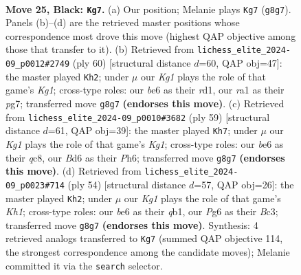 \documentclass[11pt]{article}
\begin{document}
\clearpage

\begin{figure}[p]\centering
\begin{subfigure}{0.46\textwidth}\centering
\resizebox{\linewidth}{!}{%
\newchessgame
\chessboard[
  setfen={6k1/pp5p/3bB1p1/8/8/5qP1/PP3P1P/R5K1 b - - 0 25},
  showmover=false,
  pgfstyle=straightmove, color=movearrow, markmove={g8-g7}
]}
\caption{}
\end{subfigure}\hfill
\begin{subfigure}{0.46\textwidth}\centering
\resizebox{\linewidth}{!}{%
\newchessgame
\chessboard[
  setfen={6k1/pQ3pp1/4pb1p/2p5/8/7P/P4PP1/3r2K1 w - - 2 31},
  showmover=false,
  pgfstyle=straightmove, color=movearrow, markmove={g1-h2}
]}
\caption{}
\end{subfigure}
\\[4pt]
\begin{subfigure}{0.46\textwidth}\centering
\resizebox{\linewidth}{!}{%
\newchessgame
\chessboard[
  setfen={2Q3k1/5pp1/7p/1p1P4/8/1P3qP1/r4P1P/4R1K1 b - - 2 30},
  showmover=false,
  pgfstyle=straightmove, color=movearrow, markmove={g8-h7}
]}
\caption{}
\end{subfigure}\hfill
\begin{subfigure}{0.46\textwidth}\centering
\resizebox{\linewidth}{!}{%
\newchessgame
\chessboard[
  setfen={4b1k1/p4p1p/3Q2p1/2p5/8/2B2P1P/PP4P1/1q5K w - - 1 28},
  showmover=false,
  pgfstyle=straightmove, color=movearrow, markmove={h1-h2}
]}
\caption{}
\end{subfigure}
\caption{\textbf{Move 25, Black: \texttt{Kg7}.} (a) Our position; Melanie plays \texttt{Kg7} (\texttt{g8g7}). Panels (b)--(d) are the retrieved master positions whose correspondence most drove this move (highest QAP objective among those that transfer to it). (b) Retrieved from \texttt{lichess\_elite\_2024-09\_p0012\#2749} (ply 60) [structural distance $d$=60, QAP obj=47]: the master played \texttt{Kh2}; under $\mu$ our \emph{Kg1} plays the role of that game's \emph{Kg1}; cross-type roles: our \emph{b}e6 as their \emph{r}d1, our \emph{r}a1 as their \emph{p}g7; transferred move \texttt{g8g7} \textbf{(endorses this move)}. (c) Retrieved from \texttt{lichess\_elite\_2024-09\_p0010\#3682} (ply 59) [structural distance $d$=61, QAP obj=39]: the master played \texttt{Kh7}; under $\mu$ our \emph{Kg1} plays the role of that game's \emph{Kg1}; cross-type roles: our \emph{b}e6 as their \emph{q}c8, our \emph{B}d6 as their \emph{P}h6; transferred move \texttt{g8g7} \textbf{(endorses this move)}. (d) Retrieved from \texttt{lichess\_elite\_2024-09\_p0023\#714} (ply 54) [structural distance $d$=57, QAP obj=26]: the master played \texttt{Kh2}; under $\mu$ our \emph{Kg1} plays the role of that game's \emph{Kh1}; cross-type roles: our \emph{b}e6 as their \emph{q}b1, our \emph{P}g6 as their \emph{B}c3; transferred move \texttt{g8g7} \textbf{(endorses this move)}. Synthesis: 4 retrieved analogs transferred to \texttt{Kg7} (summed QAP objective 114, the strongest correspondence among the candidate moves); Melanie committed it via the \texttt{search} selector.}
\label{fig:thought-m49}
\end{figure}
\end{document}
